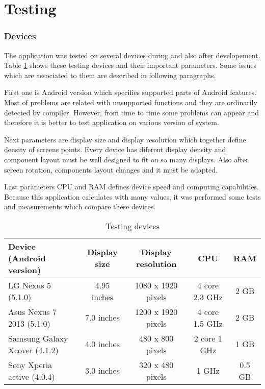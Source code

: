 
\section{Testing}

\subsubsection{Devices}
The application was tested on several devices during and also after developement. Table \ref{TestingDevicesTable} shows
these testing devices and their important parameters. Some issues which are associated to them are described in
following paragraphs.

First one is Android version which specifies supported parts of Android features. Most of problems are related with
unsupported functions and they are ordinarily detected by compiler. However, from time to time some problems can appear
and therefore it is better to test application on various version of system.

Next parameters are display size and display resolution which together define density of screens points. Every device
has diferent display density and component layout must be well designed to fit on so many displays. Also after screen
rotation, components layout changes and it must be adapted.

Last parameters CPU and RAM defines device speed and computing capabilities. Because this application calculates with
many values, it was performed some tests and measurements which compare these devices.

\begin {table}[h!]
\begin{adjustwidth}{-1cm}{}
    \begin{tabular}{|l|c|c|c|c|}
        \hline
        \textbf{Device (Android version)} & \textbf{Display size} & \textbf{Display resolution} & \textbf{CPU} & \textbf{RAM} \\ \hline \hline
        LG Nexus 5 (5.1.0)            & 4.95 inches  & 1080 x 1920 pixels & 4 core 2.3 GHz & 2 GB   \\ \hline
        Asus Nexus 7 2013 (5.1.0)     & 7.0 inches   & 1200 x 1920 pixels & 4 core 1.5 GHz & 2 GB   \\ \hline
        Samsung Galaxy Xcover (4.1.2) & 4.0 inches   & 480 x 800 pixels   & 2 core 1 GHz   & 1 GB   \\ \hline
        Sony Xperia active (4.0.4)    & 3.0 inches   & 320 x 480 pixels   & 1 GHz          & 0.5 GB \\ \hline
    \end{tabular}
    \centering
    \caption{Testing devices}
    \label{TestingDevicesTable}
    \end{adjustwidth}
\end{table}

